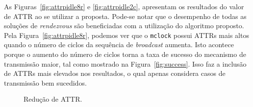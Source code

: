{As Figuras~\ref{fig:attrpidle8r} e \ref{fig:attrpidle2c}, apresentam os resultados do valor de ATTR ao se utilizar a proposta. Pode-se notar que o desempenho de todas as soluções de {\it rendezvous} são beneficiadas com a utilização do algoritmo proposto. Pela Figura~\ref{fig:attrpidle8r}, podemos ver que o {\tt mclock} possui ATTRs mais altos quando o número de ciclos da sequência de {\it broadcast} aumenta. Isto acontece porque o aumento do número de ciclos torna a taxa de sucesso do mecanismo de transmissão maior, tal como mostrado na Figura~\ref{fig:success}. Isso faz a inclusão de ATTRs mais elevados nos resultados, o qual apenas considera casos de transmissão bem sucedidos.





\begin{figure}[!htb]
	\centering
	\caption{Redução de ATTR.}
	\label{fig:attrgain}
\end{figure}



}
